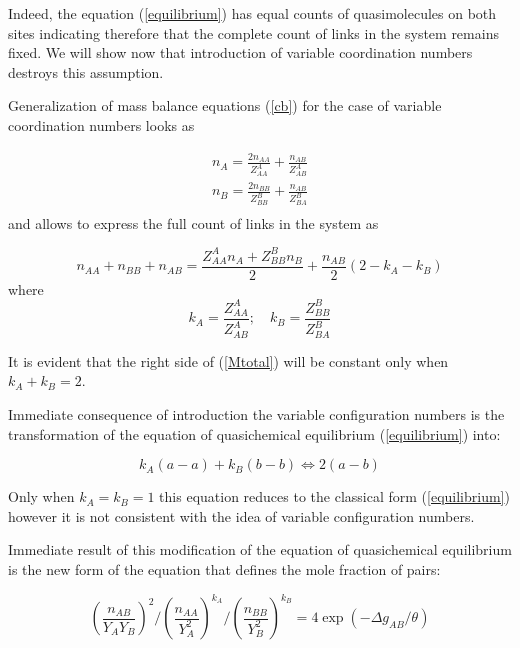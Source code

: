 \documentclass[12pt,abstract]{scrartcl}
\begin{document}
Indeed, the  equation (\ref{equilibrium}) has equal counts of quasimolecules on both sites indicating therefore that the complete count of links in the system remains fixed. We will show  now that introduction of variable coordination numbers destroys this assumption.

Generalization of mass balance equations (\ref{cb}) for the case of variable coordination numbers looks as \cite{Pelton_p1} 

\begin{equation}\label{Zab}
\begin{split}
n_A = \frac{2  n_{AA}}{Z_{AA}^A} + \frac{n_{AB}}{Z_{AB}^A}\\
n_B = \frac{2  n_{BB}}{Z_{BB}^B} + \frac{n_{AB}}{Z_{BA}^B}\\
\end{split}
\end{equation}
and allows to express the full count of links in the system as


\begin{equation}\label{Mtotal}
n_{AA} + n_{BB} + n_{AB} = \frac{Z_{AA}^A n_A + Z_{BB}^B n_B}{2} + \frac{n_{AB}}{2}
(2 - k_A - k_B)
\end{equation}
where 
\begin{equation}\label{k}
k_A = \frac{Z_{AA}^A}{Z_{AB}^A}; \quad k_B = \frac{Z_{BB}^B}{Z_{BA}^B}
\end{equation}

It is evident that the right side of (\ref{Mtotal}) will be constant only when $ k_A + k_B = 2$. 

Immediate consequence of introduction the variable configuration numbers is the transformation of the equation of quasichemical equilibrium  (\ref{equilibrium})   into:

\begin{equation} \label{equilibrium2}
k_A (a - a) +  k_B (b - b) \Leftrightarrow  2 (a - b)
\end{equation} 

Only when $k_A = k_B = 1$ this equation reduces to the classical form  (\ref{equilibrium}) however it is not consistent with the idea of variable configuration numbers.

Immediate result of this modification of the equation of quasichemical equilibrium  is the new form of the equation that defines the mole fraction of pairs:

\begin{equation}\label{eq}
\left( \frac{n_{AB}}{ Y_A Y_B} \right)^2 / \left(    \frac {n_{AA}}{Y_A^2}  \right)^{k_A} 
 / \left(    \frac {n_{BB}}{Y_B^2}  \right)^{k_B} = 4 \exp ( - \Delta g_{AB} / \theta)
\end{equation}
\end{document}
